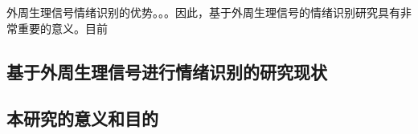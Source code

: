 外周生理信号情绪识别的优势。。。因此，基于外周生理信号的情绪识别研究具有非常重要的意义。目前


\subsection{基于外周生理信号进行情绪识别的研究现状}

\subsection{本研究的意义和目的}
